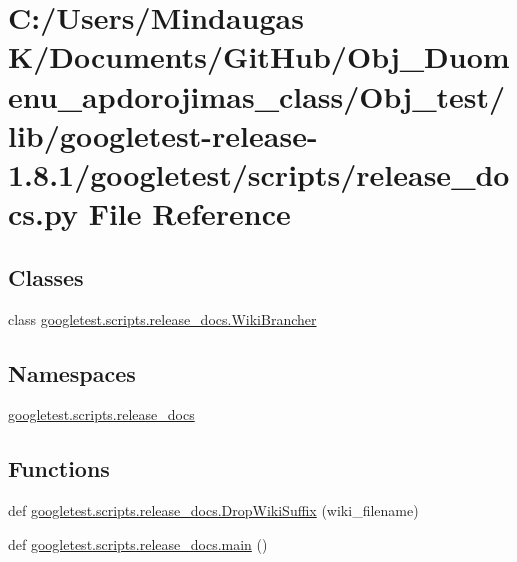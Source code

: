 \hypertarget{_obj__test_2lib_2googletest-release-1_88_81_2googletest_2scripts_2release__docs_8py}{}\section{C\+:/\+Users/\+Mindaugas K/\+Documents/\+Git\+Hub/\+Obj\+\_\+\+Duomenu\+\_\+apdorojimas\+\_\+class/\+Obj\+\_\+test/lib/googletest-\/release-\/1.8.1/googletest/scripts/release\+\_\+docs.py File Reference}
\label{_obj__test_2lib_2googletest-release-1_88_81_2googletest_2scripts_2release__docs_8py}
\subsection*{Classes}
\begin{DoxyCompactItemize}
\item 
class \mbox{\hyperlink{classgoogletest_1_1scripts_1_1release__docs_1_1_wiki_brancher}{googletest.\+scripts.\+release\+\_\+docs.\+Wiki\+Brancher}}
\end{DoxyCompactItemize}
\subsection*{Namespaces}
\begin{DoxyCompactItemize}
\item 
 \mbox{\hyperlink{namespacegoogletest_1_1scripts_1_1release__docs}{googletest.\+scripts.\+release\+\_\+docs}}
\end{DoxyCompactItemize}
\subsection*{Functions}
\begin{DoxyCompactItemize}
\item 
def \mbox{\hyperlink{namespacegoogletest_1_1scripts_1_1release__docs_a83d0803170297b8d381e1d602f95e0e3}{googletest.\+scripts.\+release\+\_\+docs.\+Drop\+Wiki\+Suffix}} (wiki\+\_\+filename)
\item 
def \mbox{\hyperlink{namespacegoogletest_1_1scripts_1_1release__docs_af26c181b4053dab1906a5a20e9be9e56}{googletest.\+scripts.\+release\+\_\+docs.\+main}} ()
\end{DoxyCompactItemize}
